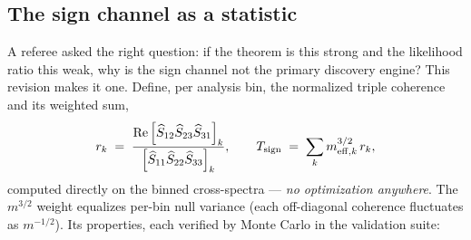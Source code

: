 \documentclass[11pt]{article}
\begin{document}
\subsection{The sign channel as a statistic}
\label{sec:signstat}

A referee asked the right question: if the theorem is this strong and the likelihood ratio this weak, why is the sign channel not the primary discovery engine? This revision makes it one. Define, per analysis bin, the normalized triple coherence and its weighted sum,
\begin{equation}
r_k \;=\; \frac{\mathrm{Re}\left[\widehat S_{12}\widehat S_{23}\widehat S_{31}\right]_k}{\left[\widehat S_{11}\widehat S_{22}\widehat S_{33}\right]_k},
\qquad
T_{\rm sign} \;=\; \sum_k m_{{\rm eff},k}^{3/2}\, r_k ,
\label{eq:signstat}
\end{equation}
computed directly on the binned cross-spectra --- \emph{no optimization anywhere}. The $m^{3/2}$ weight equalizes per-bin null variance (each off-diagonal coherence fluctuates as $m^{-1/2}$). Its properties, each verified by Monte Carlo in the validation suite:
\end{document}
